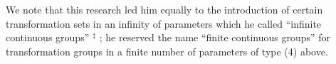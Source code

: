 We note that this research led him equally to the introduction of certain transformation sets in an infinity of parameters which he called ``infinite continuous groups'' \(^{‡}\) ; he reserved the name ``finite continuous groups'' for transformation groups in a finite number of parameters of type (4) above.

